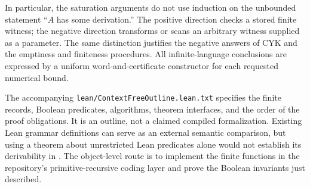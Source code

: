 In particular, the saturation arguments do not use induction on the
unbounded statement ``$A$ has some derivation.''  The positive direction
checks a stored finite witness; the negative direction transforms or
scans an arbitrary witness supplied as a parameter.  The same distinction
justifies the negative answers of CYK and the emptiness and finiteness
procedures.  All infinite-language conclusions are expressed by a uniform
word-and-certificate constructor for each requested numerical bound.

The accompanying \texttt{lean/ContextFreeOutline.lean.txt} specifies the
finite records, Boolean predicates, algorithms, theorem interfaces, and
the order of the proof obligations.  It is an outline, not a claimed
compiled formalization.  Existing Lean grammar definitions can serve as
an external semantic comparison, but using a theorem about unrestricted
Lean predicates alone would not establish its derivability in \ipra.
The object-level route is to implement the finite functions in the
repository's primitive-recursive coding layer and prove the Boolean
invariants just described.
